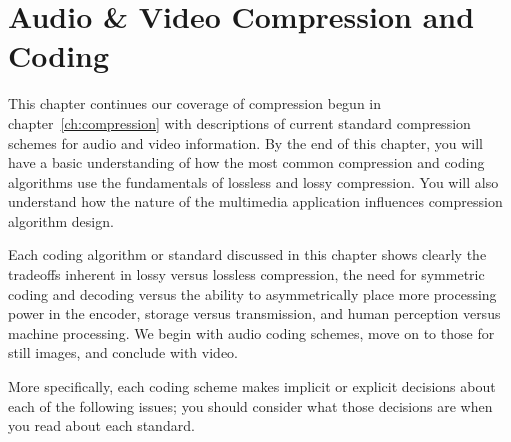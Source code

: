 
%
%
%
%

\chapter{Audio \& Video Compression and Coding}
\label{ch:audio-video}

This chapter continues our coverage of compression begun in
chapter~\ref{ch:compression} with descriptions of current standard
compression schemes for audio and video information.  By the end of
this chapter, you will have a basic understanding of how the most
common compression and coding algorithms use the fundamentals of
lossless and lossy compression. You will also understand how the
nature of the multimedia application influences compression algorithm
design.

Each coding algorithm or standard discussed in this chapter
shows clearly the tradeoffs inherent in lossy versus lossless
compression, the need for symmetric coding and decoding versus the
ability to asymmetrically place more processing power in the encoder,
storage versus transmission, and human perception versus machine
processing. We begin with audio coding schemes, move on to those
for still images, and conclude with video.

More specifically, each coding scheme makes implicit or explicit
decisions about each of the following issues; you should consider
what those decisions are when you read about each standard.

